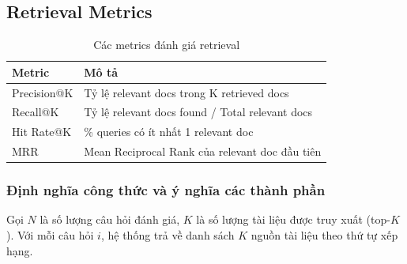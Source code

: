 \documentclass[../DoAn.tex]{subfiles}
\begin{document}
\subsection{Retrieval Metrics}
\begin{table}[h]
\centering
\begin{tabular}{|l|l|}
\hline
\textbf{Metric} & \textbf{Mô tả} \\
\hline
Precision@K & Tỷ lệ relevant docs trong K retrieved docs \\
\hline
Recall@K & Tỷ lệ relevant docs found / Total relevant docs \\
\hline
Hit Rate@K & \% queries có ít nhất 1 relevant doc \\
\hline
MRR & Mean Reciprocal Rank của relevant doc đầu tiên \\
\hline
\end{tabular}
\caption{Các metrics đánh giá retrieval}
\end{table}

\subsubsection{Định nghĩa công thức và ý nghĩa các thành phần}

Gọi $N$ là số lượng câu hỏi đánh giá, $K$ là số lượng tài liệu được truy xuất (top-$K$). Với mỗi câu hỏi $i$, hệ thống trả về danh sách $K$ nguồn tài liệu theo thứ tự xếp hạng.
\end{document}
